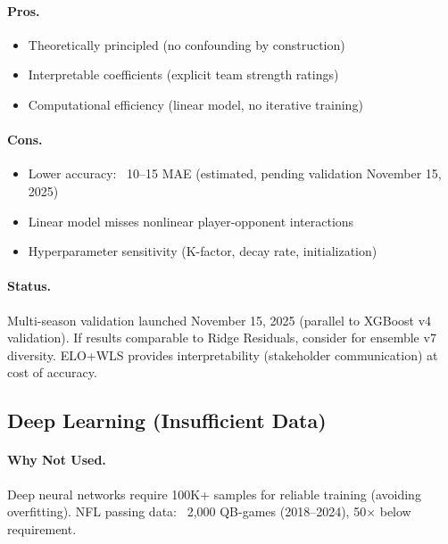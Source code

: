 \paragraph{Pros.}
\begin{itemize}[itemsep=2pt,parsep=0pt]
    \item Theoretically principled (no confounding by construction)
    \item Interpretable coefficients (explicit team strength ratings)
    \item Computational efficiency (linear model, no iterative training)
\end{itemize}

\paragraph{Cons.}
\begin{itemize}[itemsep=2pt,parsep=0pt]
    \item Lower accuracy: ~10--15 MAE (estimated, pending validation November 15, 2025)
    \item Linear model misses nonlinear player-opponent interactions
    \item Hyperparameter sensitivity (K-factor, decay rate, initialization)
\end{itemize}

\paragraph{Status.}
Multi-season validation launched November 15, 2025 (parallel to XGBoost v4 validation). If results comparable to Ridge Residuals, consider for ensemble v7 diversity. ELO+WLS provides interpretability (stakeholder communication) at cost of accuracy.

\subsection{Deep Learning (Insufficient Data)}

\paragraph{Why Not Used.}
Deep neural networks require 100K+ samples for reliable training (avoiding overfitting). NFL passing data: ~2,000 QB-games (2018--2024), 50× below requirement.

